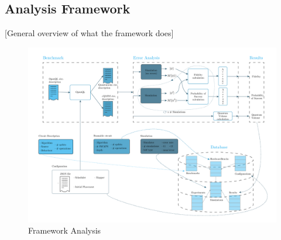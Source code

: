 \subsection*{Analysis Framework}
\label{sec:org93ec6a6}
[General overview of what the framework does]


\usepackage{wrapfig}
\usepackage{lscape}
\usepackage{rotating}
\usepackage{epstopdf}

\begin{figure}

\begin{center}
\includegraphics[width=.9\linewidth]{figures/error_framework_diagram.png}
\end{center}


    \caption{Framework Analysis}
    \label{fig:general_error_}
\end{figure}

